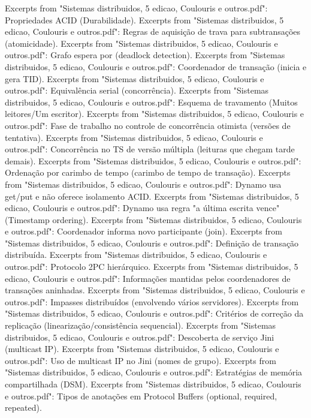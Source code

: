 \documentclass[a4paper,12pt]{article}
\begin{document}
\begin{thebibliography}{99}
 Excerpts from "Sistemas distribuidos, 5 edicao, Coulouris e outros.pdf": Propriedades ACID (Durabilidade).
 Excerpts from "Sistemas distribuidos, 5 edicao, Coulouris e outros.pdf": Regras de aquisição de trava para subtransações (atomicidade).
 Excerpts from "Sistemas distribuidos, 5 edicao, Coulouris e outros.pdf": Grafo espera por (deadlock detection).
 Excerpts from "Sistemas distribuidos, 5 edicao, Coulouris e outros.pdf": Coordenador de transação (inicia e gera TID).
 Excerpts from "Sistemas distribuidos, 5 edicao, Coulouris e outros.pdf": Equivalência serial (concorrência).
 Excerpts from "Sistemas distribuidos, 5 edicao, Coulouris e outros.pdf": Esquema de travamento (Muitos leitores/Um escritor).
 Excerpts from "Sistemas distribuidos, 5 edicao, Coulouris e outros.pdf": Fase de trabalho no controle de concorrência otimista (versões de tentativa).
 Excerpts from "Sistemas distribuidos, 5 edicao, Coulouris e outros.pdf": Concorrência no TS de versão múltipla (leituras que chegam tarde demais).
 Excerpts from "Sistemas distribuidos, 5 edicao, Coulouris e outros.pdf": Ordenação por carimbo de tempo (carimbo de tempo de transação).
 Excerpts from "Sistemas distribuidos, 5 edicao, Coulouris e outros.pdf": Dynamo usa get/put e não oferece isolamento ACID.
 Excerpts from "Sistemas distribuidos, 5 edicao, Coulouris e outros.pdf": Dynamo usa regra "a última escrita vence" (Timestamp ordering).
 Excerpts from "Sistemas distribuidos, 5 edicao, Coulouris e outros.pdf": Coordenador informa novo participante (join).
 Excerpts from "Sistemas distribuidos, 5 edicao, Coulouris e outros.pdf": Definição de transação distribuída.
 Excerpts from "Sistemas distribuidos, 5 edicao, Coulouris e outros.pdf": Protocolo 2PC hierárquico.
 Excerpts from "Sistemas distribuidos, 5 edicao, Coulouris e outros.pdf": Informações mantidas pelos coordenadores de transações aninhadas.
 Excerpts from "Sistemas distribuidos, 5 edicao, Coulouris e outros.pdf": Impasses distribuídos (envolvendo vários servidores).
 Excerpts from "Sistemas distribuidos, 5 edicao, Coulouris e outros.pdf": Critérios de correção da replicação (linearização/consistência sequencial).
 Excerpts from "Sistemas distribuidos, 5 edicao, Coulouris e outros.pdf": Descoberta de serviço Jini (multicast IP).
 Excerpts from "Sistemas distribuidos, 5 edicao, Coulouris e outros.pdf": Uso de multicast IP no Jini (nomes de grupo).
 Excerpts from "Sistemas distribuidos, 5 edicao, Coulouris e outros.pdf": Estratégias de memória compartilhada (DSM).
 Excerpts from "Sistemas distribuidos, 5 edicao, Coulouris e outros.pdf": Tipos de anotações em Protocol Buffers (optional, required, repeated).
\end{thebibliography}
\end{document}
